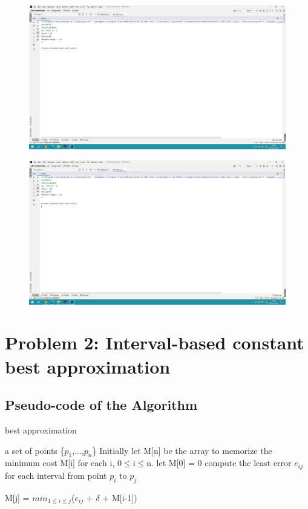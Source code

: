 \documentclass[]{article}
\begin{document}
	\begin{figure}[H]
		\centering
		\includegraphics[width=1\linewidth]{screen/A1-9}
		\caption{}
		\label{fig:a1-1}
	\end{figure}
	
	\begin{figure}[H]
		\centering
		\includegraphics[width=1\linewidth]{screen/A1-10}
		\caption{}
		\label{fig:a1-1}
	\end{figure}

	 
	
	\clearpage
	
	\section{Problem 2: Interval-based constant best approximation}
	\subsection{Pseudo-code of the Algorithm}
	\begin{algorithm}  
		\caption{best approximation}  
		\begin{algorithmic} 
			\Require a set of points \{$p_{1}$,...,$p_{n}$\}  
			\Ensure
			\State Initially let M[n] be the array to memorize the minimum cost M[i] for each i, 0$\leq$i$\leq$n.
			\State let M[0] = 0
					\State compute the least error $e_{ij}$ for each interval from point $p_{i}$ to $p_{j}$
				\EndFor
			\EndFor
			
				\State M[j] = $min_{1\leq i\leq j}$($e_{ij}$ + $\delta$ + M[i-1])
			\EndFor
		\end{algorithmic}  
	\end{algorithm} 
	
\end{document}
